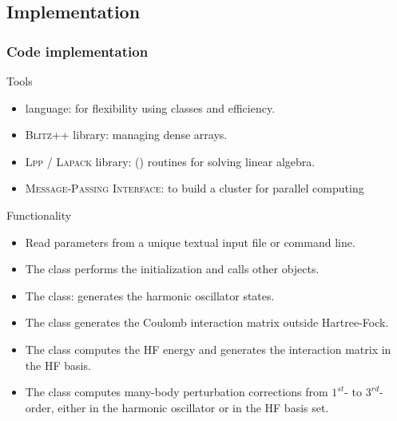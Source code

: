 \documentclass[xcolor=pdftex,hyperref={pdfpagelabels=false},table]{beamer}
\begin{document}
\subsection{Implementation}
\begin{frame}
\frametitle{Code implementation}
\begin{scriptsize}
\begin{block}{Tools}
 \begin{itemize}
 \item {} language: for flexibility using classes and efficiency.
\item \textsc{Blitz++} library: managing dense arrays.
\item \textsc{Lpp / Lapack} library: () routines for solving linear algebra.
\item  \textsc{Message-Passing Interface}: to build a cluster for parallel computing 
\end{itemize}
\end{block}
\begin{block}{Functionality}
 \begin{itemize}
 \item Read parameters from a unique textual input file or command line.
\item The  class performs the initialization and calls other objects.
\item The  class: generates the 	harmonic oscillator states.
\item The  class generates the Coulomb interaction matrix outside Hartree-Fock.
\item The  class computes the HF energy and generates the interaction matrix in the HF basis.
\item The  class computes many-body perturbation corrections from $1^{st}$-	 to $3^{rd}$-order, either in the harmonic oscillator or in the HF basis set.
\end{itemize}
\end{block}
\end{scriptsize}
\end{frame}
\end{document}
